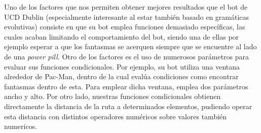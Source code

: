 Uno de los factores que nos permiten obtener mejores resultados que el bot \cite{galvan2010evolving} de UCD Dublin (especialmente interesante al estar también basado en gramáticas evolutivas) consiste en que su bot emplea funciones demasiado específicas, las cuales acaban limitando el comportamiento del bot, siendo una de ellas por ejemplo esperar a que los fantasmas se acerquen siempre que se encuentre al lado de una \textit{power pill}. 
Otro de los factores es el uso de numerosos parámetros para evaluar sus funciones condicionales. Por ejemplo, su bot utiliza una ventana alrededor de Pac-Man, dentro de la cual evalúa condiciones como encontrar fantasmas dentro de esta. Para emplear dicha ventana, emplea dos parámetros ancho y alto. Por otro lado, nuestras funciones condicionales obtienen directamente la distancia de la ruta a determinados elementos, pudiendo operar esta distancia con distintos operadores numéricos sobre valores también numericos.
